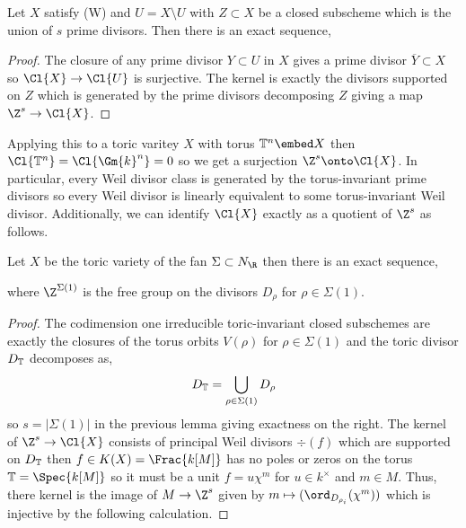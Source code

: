 \begin{lemma}
Let $X$ satisfy (W) and $U = X \setminus U$ with $Z \subset X$ be a closed subscheme which is the union of $s$ prime divisors. Then there is an exact sequence,
\begin{center}
\end{center}
\end{lemma}

\begin{proof}
The closure of any prime divisor $Y \subset U$ in $X$ gives a prime divisor $\overline{Y} \subset X$ so $\Cl{X} \to \Cl{U}$ is surjective. The kernel is exactly the divisors supported on $Z$ which is generated by the prime divisors decomposing $Z$ giving a map $\Z^s \to \Cl{X}$.  
\end{proof}
\noindent
Applying this to a toric varitey $X$ with torus $\T^n \embed X$ then $\Cl{\T^n} = \Cl{\Gm{k}^n} = 0$ so we get a surjection $\Z^s \onto \Cl{X}$. In particular, every Weil divisor class is generated by the torus-invariant prime divisors so every Weil divisor is linearly equivalent to some torus-invariant Weil divisor. Additionally, we can identify $\Cl{X}$ exactly as a quotient of $\Z^s$ as follows. 

\begin{prop}
Let $X$ be the toric variety of the fan $\Sigma \subset N_\R$ then there is an exact sequence,
\begin{center}
\end{center}
where $\Z^{\Sigma(1)}$ is the free group on the divisors $D_\rho$ for $\rho \in \Sigma(1)$. 
\end{prop}

\begin{proof}
The codimension one irreducible toric-invariant closed subschemes are exactly the closures of the torus orbits $V(\rho)$ for $\rho \in \Sigma(1)$ and the toric divisor $D_{\mathbb{T}}$ decomposes as,
\[ D_{\mathbb{T}} = \bigcup_{\rho \in \Sigma(1)} D_\rho \]
so $s = |\Sigma(1)|$ in the previous lemma giving exactness on the right. The kernel of $\Z^s \to \Cl{X}$ consists of principal Weil divisors $\div{(f)}$ which are supported on $D_{\mathbb{T}}$ then $f \in K(X) = \Frac{k[M]}$ has no poles or zeros on the torus $\T = \Spec{k[M]}$ so it must be a unit $f = u \chi^m$ for $u \in k^\times$ and $m \in M$. Thus, there kernel is the image of $M \to \Z^s$ given by $m \mapsto (\ord_{D_{\rho_i}}(\chi^m))$ which is injective by the following calculation.
\end{proof}

